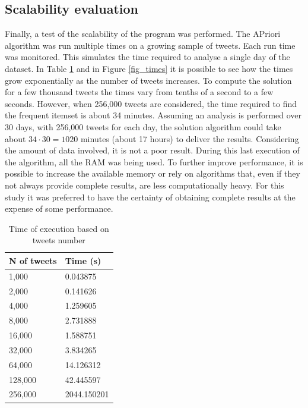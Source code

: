 \subsection*{Scalability evaluation}
Finally, a test of the scalability of the program was performed. The APriori algorithm was run multiple times on a growing sample of tweets. Each run time was monitored. This simulates the time required to analyse a single day of the dataset. In Table \ref{tab_apriori_sc} and in Figure \ref{fig_times} it is possible to see how the times grow exponentially as the number of tweets increases. To compute the solution for a few thousand tweets the times vary from tenths of a second to a few seconds. However, when 256,000 tweets are considered, the time required to find the frequent itemset is about 34 minutes. Assuming an analysis is performed over 30 days, with 256,000 tweets for each day, the solution algorithm could take about $34 \cdot 30 = 1020$ minutes (about 17 hours) to deliver the results.  Considering the amount of data involved, it is not a poor result. During this last execution of the algorithm, all the RAM was being used. To further improve performance, it is possible to increase the available memory or rely on algorithms that, even if they not always provide complete results, are less computationally heavy. For this study it was preferred to have the certainty of obtaining complete results at the expense of some performance.

  
\begin{table}[h]
  \centering
  \begin{tabular}{@{}ll@{}}
  \toprule
  \textbf{N of tweets}   & \textbf{Time (s)}                                         \\ \midrule
  1,000                  & 0.043875 \\
  2,000                  & 0.141626 \\
  4,000                  & 1.259605 \\
  8,000                  & 2.731888 \\
  16,000                 & 1.588751 \\
  32,000                 & 3.834265 \\
  64,000                 & 14.126312 \\
  128,000                & 42.445597 \\
  256,000                & 2044.150201 \\ \bottomrule
  \end{tabular}
  \caption{Time of execution based on tweets number}
  \label{tab_apriori_sc}
\end{table}

